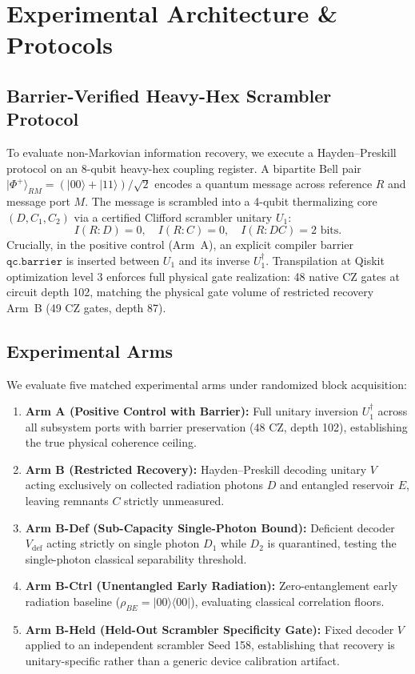 \documentclass[aps,prxquantum,reprint,superscriptaddress,floatfix]{revtex4-2}
\begin{document}
\section{Experimental Architecture \& Protocols}

\subsection{Barrier-Verified Heavy-Hex Scrambler Protocol}
To evaluate non-Markovian information recovery, we execute a Hayden--Preskill protocol on an 8-qubit heavy-hex coupling register. A bipartite Bell pair $|\Phi^+\rangle_{RM} = (|00\rangle + |11\rangle)/\sqrt{2}$ encodes a quantum message across reference $R$ and message port $M$. The message is scrambled into a 4-qubit thermalizing core $(D, C_1, C_2)$ via a certified Clifford scrambler unitary $U_1$:
\begin{equation}
    I(R:D) = 0, \quad I(R:C) = 0, \quad I(R:DC) = 2\text{ bits}.
\end{equation}
Crucially, in the positive control (Arm~A), an explicit compiler barrier $\texttt{qc.barrier}$ is inserted between $U_1$ and its inverse $U_1^\dagger$. Transpilation at Qiskit optimization level 3 enforces full physical gate realization: 48 native CZ gates at circuit depth 102, matching the physical gate volume of restricted recovery Arm~B (49 CZ gates, depth 87).

\subsection{Experimental Arms}
We evaluate five matched experimental arms under randomized block acquisition:
\begin{enumerate}
    \item \textbf{Arm A (Positive Control with Barrier):} Full unitary inversion $U_1^\dagger$ across all subsystem ports with barrier preservation ($48\text{ CZ}$, depth 102), establishing the true physical coherence ceiling.
    \item \textbf{Arm B (Restricted Recovery):} Hayden--Preskill decoding unitary $V$ acting exclusively on collected radiation photons $D$ and entangled reservoir $E$, leaving remnants $C$ strictly unmeasured.
    \item \textbf{Arm B-Def (Sub-Capacity Single-Photon Bound):} Deficient decoder $V_{\mathrm{def}}$ acting strictly on single photon $D_1$ while $D_2$ is quarantined, testing the single-photon classical separability threshold.
    \item \textbf{Arm B-Ctrl (Unentangled Early Radiation):} Zero-entanglement early radiation baseline ($\rho_{BE} = |00\rangle\langle 00|$), evaluating classical correlation floors.
    \item \textbf{Arm B-Held (Held-Out Scrambler Specificity Gate):} Fixed decoder $V$ applied to an independent scrambler Seed 158, establishing that recovery is unitary-specific rather than a generic device calibration artifact.
\end{enumerate}
\end{document}
